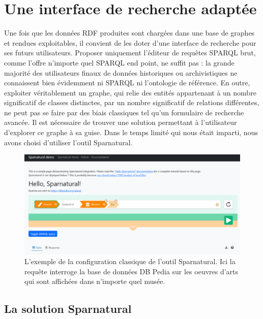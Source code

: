 \chapter{Une interface de recherche adaptée}
Une fois que les données RDF produites sont chargées dans une base de graphes et rendues exploitables, il convient de les doter d'une interface de recherche pour ses futurs utilisateurs. Proposer uniquement l'éditeur de requêtes SPARQL brut, comme l'offre n'importe quel SPARQL end point, ne suffit pas : la grande majorité des utilisateurs finaux de données historiques ou archivistiques ne connaissent bien évidemment ni SPARQL ni l'ontologie de référence. En outre, exploiter véritablement un graphe, qui relie des entités appartenant à un nombre significatif de classes distinctes, par un nombre significatif de relations différentes, ne peut pas se faire par des biais classiques tel qu'un formulaire de recherche avancée. Il est nécessaire de trouver une solution permettant à l'utilisateur d'explorer ce graphe à sa guise. Dans le temps limité qui nous était imparti, nous avons choisi d'utiliser l'outil Sparnatural.
\begin{figure}[h]
    \centering
    \includegraphics[width=1\linewidth]{images/hello sparnatural.png}
    \caption{L'exemple de la configuration classique de l'outil Sparnatural. Ici la requête interroge la base de données DB Pedia sur les oeuvres d'arts qui sont affichées dans n'importe quel musée.}
    \label{fig:hello-sparnatural}
\end{figure}
\section{La solution Sparnatural}
